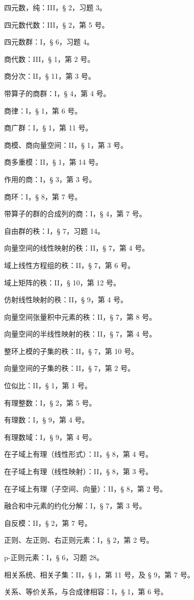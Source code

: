 四元数，纯：III，§ 2，习题 3。

四元数代数：III，§ 2，第 5 号。

四元数群：I，§ 6，习题 4。

商代数：III，§ 1，第 2 号。

商分次：II，§ 11，第 3 号。

带算子的商群：I，§ 4，第 4 号。

商律：I，§ 1，第 6 号。

商广群：I，§ 1，第 11 号。

商模、商向量空间：II，§ 1，第 3 号。

商多重模：II，§ 1，第 14 号。

作用的商：I，§ 3，第 3 号。

商环：I，§ 8，第 7 号。

带算子的群的合成列的商：I，§ 4，第 7 号。

自由群的秩：I，§ 7，习题 14。

向量空间的线性映射的秩：II，§ 7，第 4 号。

域上线性方程组的秩：II，§ 7，第 6 号。

域上矩阵的秩：II，§ 10，第 12 号。

仿射线性映射的秩：II，§ 9，第 4 号。

向量空间张量积中元素的秩：II，§ 7，第 8 号。

向量空间的半线性映射的秩：II，§ 7，第 4 号。

整环上模的子集的秩：II，§ 7，第 10 号。

向量空间的子集的秩：II，§ 7，第 2 号。

位似比：II，§ 1，第 1 号。

有理整数：I，§ 2，第 5 号。

有理数：I，§ 9，第 4 号。

有理数域：I，§ 9，第 4 号。

在子域上有理（线性形式）：II，§ 8，第 4 号。

在子域上有理（线性映射）：II，§ 8，第 3 号。

在子域上有理（子空间、向量）：II，§ 8，第 2 号。

融合和中元素的约化分解：I，§ 7，第 3 号。

自反模：II，§ 2，第 7 号。

正则、左正则、右正则元素：I，§ 2，第 2 号。

p-正则元素：I，§ 6，习题 28。

相关系统、相关子集：II，§ 1，第 11 号，及 § 9，第 7 号。

关系、等价关系，与合成律相容：I，§ 1，第 6 号。

